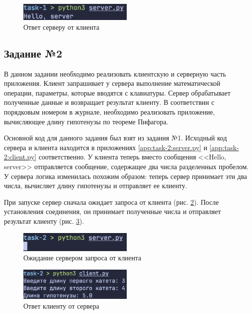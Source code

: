 \documentclass[a4paper, 14pt]{extarticle}
\begin{document}
\begin{figure}[H]
  \centering
  \includegraphics[width=0.5\textwidth]{images/task-1/server-result.png}
  \caption{Ответ серверу от клиента}
  \label{fig:task-1:server-result}
\end{figure}

\subsection*{Задание №2}

В данном задании необходимо реализовать клиентскую и серверную часть приложения.
Клиент запрашивает у сервера выполнение математической операции, параметры,
которые вводятся с клавиатуры. Сервер обрабатывает полученные данные и
возвращает результат клиенту. В соответствии с порядковым номером в журнале,
необходимо реализовать приложение, вычисляющее длину гипотенузы по теореме
Пифагора.

Основной код для данного задания был взят из задания №1. Исходный код сервера и
клиента находится в приложениях \ref{app:task-2:server.py} и
\ref{app:task-2:client.py} соответственно. У клиента теперь вместо сообщения
<<Hello, server>> отправляется сообщение, содержащее два числа разделенных
пробелом. У сервера логика изменилась похожим образом: теперь сервер принимает
эти два числа, вычисляет длину гипотенузы и отправляет ее клиенту.

При запуске сервер сначала ожидает запроса от клиента (рис.
\ref{fig:task-2:server-waits}). После установления соединения, он принимает
полученные числа и отправляет результат клиенту (рис.
\ref{fig:task-2:client-result}).

\begin{figure}[H]
  \centering
  \includegraphics[width=0.5\textwidth]{images/task-2/server-waits.png}
  \caption{Ожидание сервером запроса от клиента}
  \label{fig:task-2:server-waits}
\end{figure}

\begin{figure}[H]
  \centering
  \includegraphics[width=0.5\textwidth]{images/task-2/client-result.png}
  \caption{Ответ клиенту от сервера}
  \label{fig:task-2:client-result}
\end{figure}
\end{document}
